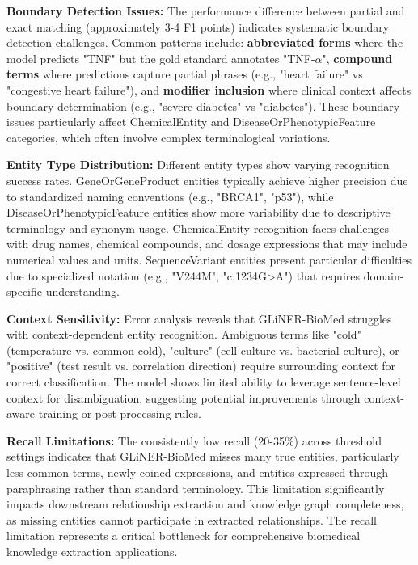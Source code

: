 \textbf{Boundary Detection Issues:} The performance difference between partial and exact matching (approximately 3-4 F1 points) indicates systematic boundary detection challenges. Common patterns include: \textbf{abbreviated forms} where the model predicts "TNF" but the gold standard annotates "TNF-$\alpha$", \textbf{compound terms} where predictions capture partial phrases (e.g., "heart failure" vs "congestive heart failure"), and \textbf{modifier inclusion} where clinical context affects boundary determination (e.g., "severe diabetes" vs "diabetes"). These boundary issues particularly affect ChemicalEntity and DiseaseOrPhenotypicFeature categories, which often involve complex terminological variations.

\textbf{Entity Type Distribution:} Different entity types show varying recognition success rates. GeneOrGeneProduct entities typically achieve higher precision due to standardized naming conventions (e.g., "BRCA1", "p53"), while DiseaseOrPhenotypicFeature entities show more variability due to descriptive terminology and synonym usage. ChemicalEntity recognition faces challenges with drug names, chemical compounds, and dosage expressions that may include numerical values and units. SequenceVariant entities present particular difficulties due to specialized notation (e.g., "V244M", "c.1234G>A") that requires domain-specific understanding.

\textbf{Context Sensitivity:} Error analysis reveals that GLiNER-BioMed struggles with context-dependent entity recognition. Ambiguous terms like "cold" (temperature vs. common cold), "culture" (cell culture vs. bacterial culture), or "positive" (test result vs. correlation direction) require surrounding context for correct classification. The model shows limited ability to leverage sentence-level context for disambiguation, suggesting potential improvements through context-aware training or post-processing rules.

\textbf{Recall Limitations:} The consistently low recall (20-35\%) across threshold settings indicates that GLiNER-BioMed misses many true entities, particularly less common terms, newly coined expressions, and entities expressed through paraphrasing rather than standard terminology. This limitation significantly impacts downstream relationship extraction and knowledge graph completeness, as missing entities cannot participate in extracted relationships. The recall limitation represents a critical bottleneck for comprehensive biomedical knowledge extraction applications.

